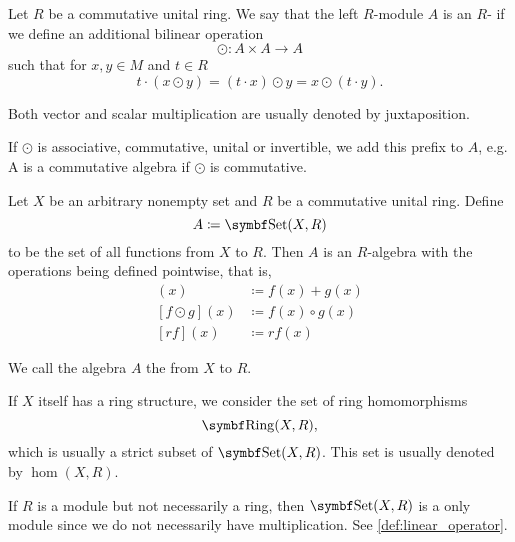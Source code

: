 \begin{definition}\label{def:algebra_over_ring}\cite[408]{Knapp2016BAlg}
  Let \( R \) be a commutative unital ring. We say that the left \( R \)-module \( A \) is an \( R \)- if we define an additional bilinear  operation
  \begin{equation*}
    \odot: A \times A \to A
  \end{equation*}
  such that for \( x, y \in M \) and \( t \in R \)
  \begin{equation*}
    t \cdot (x \odot y) = (t \cdot x) \odot y = x \odot (t \cdot y).
  \end{equation*}

  Both vector and scalar multiplication are usually denoted by juxtaposition.

  If \( \odot \) is associative, commutative, unital or invertible, we add this prefix to \( A \), e.g. A is a commutative algebra if \( \odot \) is commutative.
\end{definition}

\begin{proposition}\label{thm:functions_over_ring_form_algebra}
  Let \( X \) be an arbitrary nonempty set and \( R \) be a commutative unital ring. Define
  \begin{equation*}
    A \coloneqq \Cat{Set}(X, R)
  \end{equation*}
  to be the set of all functions from \( X \) to \( R \). Then \( A \) is an \( R \)-algebra with the operations being defined pointwise, that is,
  \begin{align*}
    [f + g](x) &\coloneqq f(x) + g(x) \\
    [f \odot g](x) &\coloneqq f(x) \circ g(x) \\
    [rf](x) &\coloneqq r f(x) 
  \end{align*}

  We call the algebra \( A \) the  from \( X \) to \( R \).

  If \( X \) itself has a ring structure, we consider the set of ring homomorphisms
  \begin{equation*}
    \Cat{Ring}(X, R),
  \end{equation*}
  which is usually a strict subset of \( \Cat{Set}(X, R) \). This set is usually denoted by \( \hom(X, R) \).

  If \( R \) is a module but not necessarily a ring, then \( \Cat{Set}(X, R) \) is a only module since we do not necessarily have multiplication. See \cref{def:linear_operator}.
\end{proposition}

